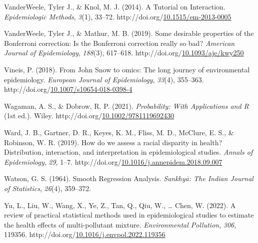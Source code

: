\documentclass[12pt, twoside]{amherstthesis}
\newenvironment{CSLReferences}[2]%
  {}%
  {\par}
\begin{document}
\begin{CSLReferences}{1}{0}
\leavevmode{}%
VanderWeele, Tyler J., \& Knol, M. J. (2014). A {Tutorial} on {Interaction}. \emph{Epidemiologic Methods}, \emph{3}(1), 33--72. http://doi.org/\href{https://doi.org/10.1515/em-2013-0005}{10.1515/em-2013-0005}

\leavevmode{}%
VanderWeele, Tyler J., \& Mathur, M. B. (2019). Some desirable properties of the {Bonferroni} correction: {Is} the {Bonferroni} correction really so bad? \emph{American Journal of Epidemiology}, \emph{188}(3), 617--618. http://doi.org/\href{https://doi.org/10.1093/aje/kwy250}{10.1093/aje/kwy250}

\leavevmode{}%
Vineis, P. (2018). From {John} {Snow} to omics: The long journey of environmental epidemiology. \emph{European Journal of Epidemiology}, \emph{33}(4), 355--363. http://doi.org/\href{https://doi.org/10.1007/s10654-018-0398-4}{10.1007/s10654-018-0398-4}

\leavevmode{}%
Wagaman, A. S., \& Dobrow, R. P. (2021). \emph{Probability: {With} {Applications} and {R}} (1st ed.). Wiley. http://doi.org/\href{https://doi.org/10.1002/9781119692430}{10.1002/9781119692430}

\leavevmode{}%
Ward, J. B., Gartner, D. R., Keyes, K. M., Fliss, M. D., McClure, E. S., \& Robinson, W. R. (2019). How do we assess a racial disparity in health? {Distribution}, interaction, and interpretation in epidemiological studies. \emph{Annals of Epidemiology}, \emph{29}, 1--7. http://doi.org/\href{https://doi.org/10.1016/j.annepidem.2018.09.007}{10.1016/j.annepidem.2018.09.007}

\leavevmode{}%
Watson, G. S. (1964). Smooth {Regression} {Analysis}. \emph{Sankhyā: The Indian Journal of Statistics}, \emph{26}(4), 359--372.

\leavevmode{}%
Yu, L., Liu, W., Wang, X., Ye, Z., Tan, Q., Qiu, W., \ldots{} Chen, W. (2022). A review of practical statistical methods used in epidemiological studies to estimate the health effects of multi-pollutant mixture. \emph{Environmental Pollution}, \emph{306}, 119356. http://doi.org/\href{https://doi.org/10.1016/j.envpol.2022.119356}{10.1016/j.envpol.2022.119356}

\end{CSLReferences}
\end{document}
